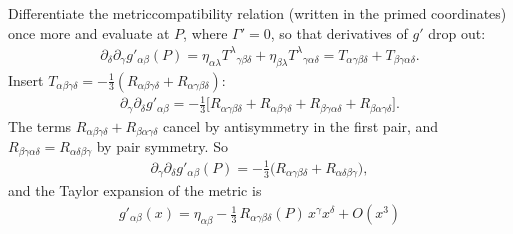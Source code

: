 \documentclass[letterpaper,10pt,english]{jupyterBook}
\begin{document}
\sphinxAtStartPar
Differentiate the metric\sphinxhyphen{}compatibility relation  (written in the primed coordinates) once more and evaluate at \(P\), where \(\Gamma'=0\), so that derivatives of \(g'\) drop out:
\begin{equation*}
\begin{split}
\partial_\delta\partial_\gamma g'_{\alpha\beta}(P)=\eta_{\alpha\lambda}T^\lambda{}_{\gamma\beta\delta}+\eta_{\beta\lambda}T^\lambda{}_{\gamma\alpha\delta}
=T_{\alpha\gamma\beta\delta}+T_{\beta\gamma\alpha\delta}.
\end{split}
\end{equation*}
\sphinxAtStartPar
Insert \(T_{\alpha\beta\gamma\delta}=-\tfrac13(R_{\alpha\beta\gamma\delta}+R_{\alpha\gamma\beta\delta})\):
\begin{equation*}
\begin{split}
\partial_\gamma\partial_\delta g'_{\alpha\beta}=-\tfrac13\Big[R_{\alpha\gamma\beta\delta}+R_{\alpha\beta\gamma\delta}+R_{\beta\gamma\alpha\delta}+R_{\beta\alpha\gamma\delta}\Big].
\end{split}
\end{equation*}
\sphinxAtStartPar
The terms \(R_{\alpha\beta\gamma\delta}+R_{\beta\alpha\gamma\delta}\) cancel by antisymmetry in the first pair, and \(R_{\beta\gamma\alpha\delta}=R_{\alpha\delta\beta\gamma}\) by pair symmetry. So
\begin{equation*}
\begin{split}
\partial_\gamma\partial_\delta g'_{\alpha\beta}(P)=-\tfrac13\big(R_{\alpha\gamma\beta\delta}+R_{\alpha\delta\beta\gamma}\big),
\end{split}
\end{equation*}
\sphinxAtStartPar
and the Taylor expansion of the metric is
\begin{equation}\label{equation:ch/relativity-general/local-inertial-reference-frame-and-equivalence-principle:eq-rnc}
\begin{split}
\boxed{\,g'_{\alpha\beta}(x)=\eta_{\alpha\beta}-\tfrac13\,R_{\alpha\gamma\beta\delta}(P)\,x^\gamma x^\delta+O(x^3)\,}
\end{split}
\end{equation}
\end{document}
